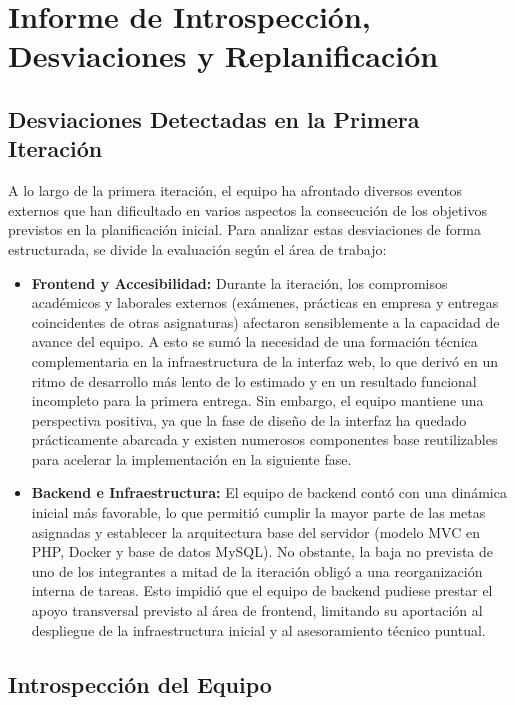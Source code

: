 \section{Informe de Introspección, Desviaciones y Replanificación}

\subsection{Desviaciones Detectadas en la Primera Iteración}

A lo largo de la primera iteración, el equipo ha afrontado diversos eventos externos que han dificultado en varios aspectos la consecución de los objetivos previstos en la planificación inicial. Para analizar estas desviaciones de forma estructurada, se divide la evaluación según el área de trabajo:

\begin{itemize}[leftmargin=1.5em, itemsep=4pt]
    \item \textbf{Frontend y Accesibilidad:} Durante la iteración, los compromisos académicos y laborales externos (exámenes, prácticas en empresa y entregas coincidentes de otras asignaturas) afectaron sensiblemente a la capacidad de avance del equipo. A esto se sumó la necesidad de una formación técnica complementaria en la infraestructura de la interfaz web, lo que derivó en un ritmo de desarrollo más lento de lo estimado y en un resultado funcional incompleto para la primera entrega. Sin embargo, el equipo mantiene una perspectiva positiva, ya que la fase de diseño de la interfaz ha quedado prácticamente abarcada y existen numerosos componentes base reutilizables para acelerar la implementación en la siguiente fase.
    
    \item \textbf{Backend e Infraestructura:} El equipo de backend contó con una dinámica inicial más favorable, lo que permitió cumplir la mayor parte de las metas asignadas y establecer la arquitectura base del servidor (modelo MVC en PHP, Docker y base de datos MySQL). No obstante, la baja no prevista de uno de los integrantes a mitad de la iteración obligó a una reorganización interna de tareas. Esto impidió que el equipo de backend pudiese prestar el apoyo transversal previsto al área de frontend, limitando su aportación al despliegue de la infraestructura inicial y al asesoramiento técnico puntual.
\end{itemize}

\subsection{Introspección del Equipo}

